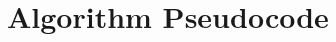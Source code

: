 \renewcommand{\prechaptername}{Appendix}
\renewcommand{\postchaptername}{}
\renewcommand{\thechapter}{\Alph{chapter}}
\setcounter{chapter}{0}

\chapter{Algorithm Pseudocode}

